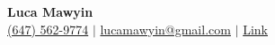 \documentclass[letterpaper]{article}%
\begin{document}
%
\normalsize%

    \begin{center}
        {\Huge \textbf{Luca Mawyin}} \\[1em]
        \href{tel:6475629774}{(647) 562-9774} $|$
        \href{mailto:lucamawyin@gmail.com}{lucamawyin@gmail.com}
        $|$ \href{https://example.com}{Link}
    \end{center}
\end{document}
